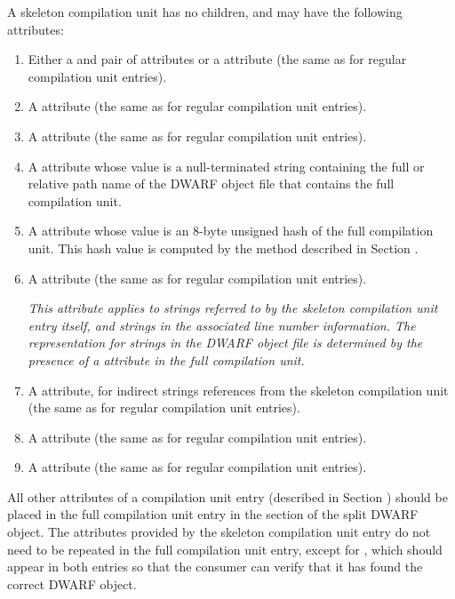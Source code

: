A skeleton compilation unit has no
children, and may have the following attributes:
\begin{enumerate}[1. ]

\item
Either a \DWATlowpc{} and \DWAThighpc{} pair of attributes
or a \DWATranges{} attribute (the same as for regular
compilation unit entries).

\item
A \DWATstmtlist{} attribute (the same as for regular
compilation unit entries).

\item
A \DWATcompdir{} attribute (the same as for regular
compilation unit entries).

\item
{}
A \DWATdwonameNAME{} attribute whose value is a
null-terminated string containing the full or relative
path name of the DWARF object file that contains the full
compilation unit.

\item
{}
A \DWATdwoidNAME{} attribute whose value is an 8-byte
unsigned hash of the full compilation unit.  This hash
value is computed by the method described in 
Section .

\item
A \DWATuseUTFeight{} attribute (the same as for regular compilation unit
entries).

\textit{This attribute applies to strings referred to by the skeleton
compilation unit entry itself, and strings in the associated line
number information.
The representation for strings in the DWARF object file is determined
by the presence of a \DWATuseUTFeight{} attribute in the full compilation
unit.}

\item
A \DWATstroffsetsbase{} attribute, for indirect strings references 
from the skeleton compilation unit (the same as for regular 
compilation unit entries).

\item
A \DWATaddrbase{} attribute (the same as for regular
compilation unit entries).

\item
A \DWATrangesbase{} attribute (the same as for regular
compilation unit entries).

\end{enumerate}

All other attributes of a compilation unit entry (described
in Section ) 
should be placed in the full compilation
unit entry in the \dotdebuginfodwo{} section of the split DWARF
object. The attributes provided by the skeleton compilation
unit entry do not need to be repeated in the full compilation
unit entry, except for \DWATdwoid, which should appear in
both entries so that the consumer can verify that it has
found the correct DWARF object.


